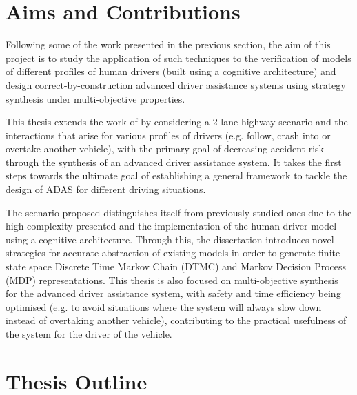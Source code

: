 \section{Aims and Contributions}

Following some of the work presented in the previous section, the aim of this project is to study the application of such techniques to the verification of models of different profiles of human drivers (built using a cognitive architecture) and design correct-by-construction advanced driver assistance systems using strategy synthesis under multi-objective properties. 

This thesis extends the work of \cite{games, lam, salvucci_1} by considering a 2-lane highway scenario and the interactions that arise for various profiles of drivers (e.g. follow, crash into or overtake another vehicle), with the primary goal of decreasing accident risk through the synthesis of an advanced driver assistance system. It takes the first steps towards the ultimate goal of establishing a general framework to tackle the design of ADAS for different driving situations.

The scenario proposed distinguishes itself from previously studied ones due to the high complexity presented and the implementation of the human driver model using a cognitive architecture. Through this, the dissertation  introduces novel strategies for accurate abstraction of existing models in order to generate finite state space Discrete Time Markov Chain (DTMC) and Markov Decision Process (MDP) representations. This thesis is also focused on multi-objective synthesis for the advanced driver assistance system, with safety and time efficiency being optimised (e.g. to avoid situations where the system will always slow down instead of overtaking another vehicle), contributing to the practical usefulness of the system for the driver of the vehicle. 

\section{Thesis Outline}

